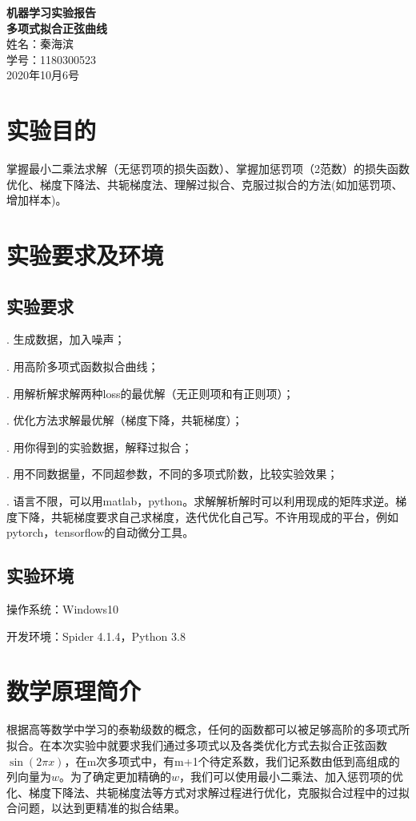 \documentclass[12pt]{article}
\begin{document}
 
\begin{titlepage}
\begin{center}      
{\Huge \bfseries 机器学习实验报告}\\[1cm]
{\Large \bfseries 多项式拟合正弦曲线}\\[10cm]
{\Large 姓名：秦海滨}\\[1cm]
{\Large 学号：1180300523}\\[8cm]
{\Large 2020年10月6号}
\end{center}
\end{titlepage}
\newpage
\tableofcontents
\newpage
\section{实验目的}
掌握最小二乘法求解（无惩罚项的损失函数）、掌握加惩罚项（2范数）的损失函数优化、梯度下降法、共轭梯度法、理解过拟合、克服过拟合的方法(如加惩罚项、增加样本)。
\section{实验要求及环境}
\subsection{实验要求}
. 生成数据，加入噪声；\par
{}. 用高阶多项式函数拟合曲线；\par
{}. 用解析解求解两种loss的最优解（无正则项和有正则项）；\par
{}. 优化方法求解最优解（梯度下降，共轭梯度）；\par
{}. 用你得到的实验数据，解释过拟合；\par
{}. 用不同数据量，不同超参数，不同的多项式阶数，比较实验效果；\par
{}. 语言不限，可以用matlab，python。求解解析解时可以利用现成的矩阵求逆。梯度下降，共轭梯度要求自己求梯度，迭代优化自己写。不许用现成的平台，例如pytorch，tensorflow的自动微分工具。\par
\subsection{实验环境}
\noindent 操作系统：Windows10 \par
\noindent 开发环境：Spider 4.1.4，Python 3.8 \par
\section{数学原理简介}
根据高等数学中学习的泰勒级数的概念，任何的函数都可以被足够高阶的多项式所拟合。在本次实验中就要求我们通过多项式以及各类优化方式去拟合正弦函数$\sin (2 \pi x)$，在m次多项式中，有m+1个待定系数，我们记系数由低到高组成的列向量为$w$。为了确定更加精确的$w$，我们可以使用最小二乘法、加入惩罚项的优化、梯度下降法、共轭梯度法等方式对求解过程进行优化，克服拟合过程中的过拟合问题，以达到更精准的拟合结果。\par
\end{document}
